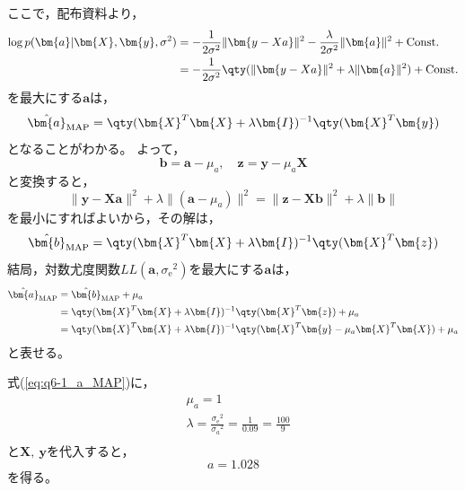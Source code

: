 \documentclass[class=jsarticle, crop=false, dvipdfmx, fleqn]{standalone}
\begin{document}
ここで，配布資料より，
\begin{equation}
\begin{split}
\log p(\bm{a} | \bm{X}, \bm{y}, \sigma^2) & = -\frac{1}{2 \sigma^2} \|\bm{y - Xa}\|^2 - \frac{\lambda}{2\sigma^2} \|\bm{a}\|^2 + \mathrm{Const.} \\
	& = -\frac{1}{2 \sigma^2} \qty(\|\bm{y - Xa}\|^2 + \lambda \|\bm{a}\|^2) + \mathrm{Const.}
\end{split}
\end{equation}
を最大にする$\bm{a}$は，
\begin{equation}
\hat{\bm{a}}_\mathrm{MAP} = \qty(\bm{X}^T \bm{X} + \lambda \bm{I})^{-1} \qty(\bm{X}^T \bm{y})
\end{equation}
となることがわかる。
よって，
\begin{equation}
\bm{b} = \bm{a} - \mu_a, \quad
\bm{z} = \bm{y} - \mu_a \bm{X}
\end{equation}
と変換すると，
\begin{equation}
\|\bm{y - Xa}\|^2 + \lambda \|(\bm{a} - \mu_a)\|^2 = \|\bm{z - Xb}\|^2 + \lambda \|\bm{b}\|
\end{equation}
を最小にすればよいから，その解は，
\begin{equation}
\hat{\bm{b}}_\mathrm{MAP} = \qty(\bm{X}^T \bm{X} + \lambda \bm{I})^{-1} \qty(\bm{X}^T \bm{z})
\end{equation}
結局，対数尤度関数$LL(\bm{a}, {\sigma_\mathrm{e}}^2)$を最大にする$\bm{a}$は，
\begin{equation}
\begin{split}
\hat{\bm{a}}_\mathrm{MAP} & = \hat{\bm{b}}_\mathrm{MAP} + \mu_a \\
	& = \qty(\bm{X}^T \bm{X} + \lambda \bm{I})^{-1} \qty(\bm{X}^T \bm{z}) + \mu_a \\
	& = \qty(\bm{X}^T \bm{X} + \lambda \bm{I})^{-1} \qty(\bm{X}^T \bm{y} - \mu_a \bm{X}^T \bm{X}) + \mu_a
\end{split}
\label{eq:q6-1_a_MAP}
\end{equation}
と表せる。

式(\ref{eq:q6-1_a_MAP})に，
\begin{align}
& \mu_a = 1 \\
& \lambda = \frac{{\sigma_\mathrm{e}}^2}{{\sigma_a}^2} = \frac{1}{0.09} = \frac{100}{9} \\
\end{align}
と$\bm{X},\ \bm{y}$を代入すると，
\begin{equation}
a = 1.028
\end{equation}
を得る。
\end{document}
